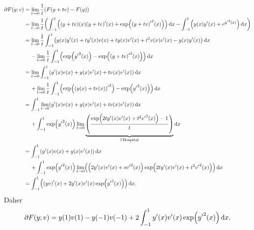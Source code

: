 \documentclass{exercise}
\begin{document}
	\begin{align*}
		\partial F\parentheses*{y; v} &= \lim_{t \to 0}\frac{1}{t}\parentheses*{F\parentheses*{y + tv} - F\parentheses*{y}}\\
		&= \lim_{t \to 0}\frac{1}{t}\parentheses*{\int_{-1}^1 \parentheses*{\parentheses*{y + tv}\parentheses*{x}\parentheses*{y + tv}'\parentheses*{x} + \exp\parentheses*{{\parentheses*{y + tv}'}^2\parentheses*{x}}}\d x - \int_{-1}^1 \parentheses*{y\parentheses*{x}y'\parentheses*{x} + e^{{y'}^2\parentheses*{x}}}\d x}\\
		&= \lim_{t \to 0}\frac{1}{t}\int_{-1}^1 \parentheses*{y\parentheses*{x}y'\parentheses*{x} + ty'\parentheses*{x}v\parentheses*{x} + ty\parentheses*{x}v'\parentheses*{x} + t^2 v\parentheses*{x}v'\parentheses*{x} - y\parentheses*{x}y'\parentheses*{x}}\d x\\
		&\quad\, - \lim_{t \to 0}\frac{1}{t}\int_{-1}^1 \parentheses*{\exp\parentheses*{{y'}^2\parentheses*{x}} - \exp\parentheses*{{\parentheses*{y + tv}'}^2\parentheses*{x}}}\d x\\
		&= \lim_{t \to 0}\int_{-1}^1 \parentheses*{y'\parentheses*{x}v\parentheses*{x} + y\parentheses*{x}v'\parentheses*{x} + tv\parentheses*{x}v'\parentheses*{x}}\d x\\
		&\quad\, + \lim_{t \to 0}\frac{1}{t}\int_{-1}^1 \parentheses*{\exp\parentheses*{{\parentheses*{y\parentheses*{x} + tv\parentheses*{x}}'}^2} - \exp\parentheses*{{y'}^2\parentheses*{x}}}\d x\\
		&= \int_{-1}^1 \lim_{t \to 0}\parentheses*{y'\parentheses*{x}v\parentheses*{x} + y\parentheses*{x}v'\parentheses*{x} + tv\parentheses*{x}v'\parentheses*{x}}\d x\\
		&\quad\, + \int_{-1}^1 \exp\parentheses*{{y'}^2\parentheses*{x}}\lim_{t \to 0}\underbrace{\parentheses*{\frac{\exp\parentheses*{2ty'\parentheses*{x}v'\parentheses*{x} + t^2 {v'}^2\parentheses*{x}} - 1}{t}}}_{\text{l'Hospital}}\d x\\
		&= \int_{-1}^1 \parentheses*{y'\parentheses*{x}v\parentheses*{x} + y\parentheses*{x}v'\parentheses*{x}}\d x\\
		&\quad\, + \int_{-1}^1 \exp\parentheses*{{y'}^2\parentheses*{x}}\lim_{t \to 0}\parentheses*{\parentheses*{2y'\parentheses*{x}v'\parentheses*{x} + s{v'}^2\parentheses*{x}}\exp\parentheses*{2ty'\parentheses*{x}v'\parentheses*{x} + t^2 {v'}^2\parentheses*{x}}}\d x\\
		&= \int_{-1}^1 \parentheses*{\parentheses*{yv}'\parentheses*{x} + 2y'\parentheses*{x}v'\parentheses*{x}\exp\parentheses*{{y'}^2\parentheses*{x}}}\d x.
	\end{align*}
	Daher
	\[
		\partial F\parentheses*{y; v} = y\parentheses*{1}v\parentheses*{1} - y\parentheses*{-1}v\parentheses*{-1} + 2\int_{-1}^1 y'\parentheses*{x}v'\parentheses*{x}\exp\parentheses*{{y'}^2\parentheses*{x}}\d x.
	\]
\end{document}
